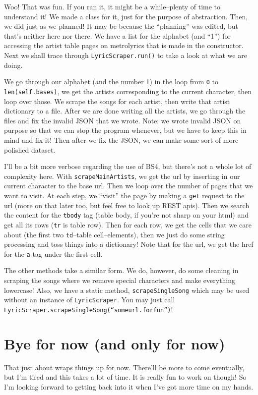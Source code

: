 \documentclass[12pt, twoside, reqno]{book}
\begin{document}
Woo! That was fun. If you ran it, it might be a while--plenty of time to understand it! We made a class for it, just for the purpose of abstraction. Then, we did just as we planned! It may be because the ``planning'' was edited, but that's neither here nor there. We have a list for the alphabet (and ``1'') for accessing the artist table pages on metrolyrics that is made in the constructor. Next we shall trace through \texttt{LyricScraper.run()} to take a look at what we are doing.

We go through our alphabet (and the number 1) in the loop from \texttt{0} to \texttt{len(self.bases)}, we get the artists corresponding to the current character, then loop over those. We scrape the songs for each artist, then write that artist dictionary to a file. After we are done writing all the artists, we go through the files and fix the invalid JSON that we wrote. Note: we wrote invalid JSON on purpose so that we can stop the program whenever, but we have to keep this in mind and fix it! Then after we fix the JSON, we can make some sort of more polished dataset.

I'll be a bit more verbose regarding the use of BS4, but there's not a whole lot of complexity here. With \texttt{scrapeMainArtists}, we get the url by inserting in our current character to the base url. Then we loop over the number of pages that we want to visit. At each step, we ``visit'' the page by making a \texttt{get} request to the url (more on that later too, but feel free to look up REST apis). Then we search the content for the \texttt{tbody} tag (table body, if you're not sharp on your html) and get all its rows (\texttt{tr} is table row). Then for each row, we get the cells that we care about (the first two \texttt{td}--table cell--elements), then we just do some string processing and toss things into a dictionary! Note that for the url, we get the href for the \texttt{a} tag under the first cell.

The other methods take a similar form. We do, however, do some cleaning in scraping the songs where we remove special characters and make everything lowercase! Also, we have a static method, \texttt{scrapeSingleSong} which may be used without an instance of \texttt{LyricScraper}. You may just call \texttt{LyricScraper.scrapeSingleSong(``someurl.forfun'')}!

\section{Bye for now (and only for now)}

That just about wraps things up for now. There'll be more to come eventually, but I'm tired and this takes a lot of time. It is really fun to work on though! So I'm looking forward to getting back into it when I've got more time on my hands.
\end{document}
